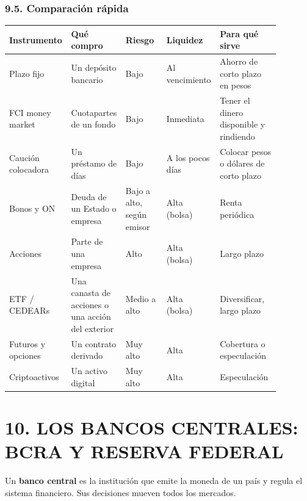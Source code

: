 \subsubsection*{9.5. Comparación rápida}
\begin{center}
\footnotesize
\setlength{\tabcolsep}{3pt}
\begin{tabular}{|>{\raggedright\arraybackslash}p{0.17\linewidth}|>{\raggedright\arraybackslash}p{0.17\linewidth}|>{\raggedright\arraybackslash}p{0.15\linewidth}|>{\raggedright\arraybackslash}p{0.17\linewidth}|>{\raggedright\arraybackslash}p{0.22\linewidth}|}
\hline
\textbf{Instrumento} & \textbf{Qué compro} & \textbf{Riesgo} & \textbf{Liquidez} &
\textbf{Para qué sirve} \\ \hline
Plazo fijo & Un depósito bancario & Bajo & Al vencimiento & Ahorro de corto plazo en pesos \\
\hline
FCI money market & Cuotapartes de un fondo & Bajo & Inmediata & Tener el dinero disponible y
rindiendo \\ \hline
Caución colocadora & Un préstamo de días & Bajo & A los pocos días & Colocar pesos o dólares
de corto plazo \\ \hline
Bonos y ON & Deuda de un Estado o empresa & Bajo a alto, según emisor & Alta (bolsa) & Renta
periódica \\ \hline
Acciones & Parte de una empresa & Alto & Alta (bolsa) & Largo plazo \\ \hline
ETF / CEDEARs & Una canasta de acciones o una acción del exterior & Medio a alto & Alta (bolsa)
& Diversificar, largo plazo \\ \hline
Futuros y opciones & Un contrato derivado & Muy alto & Alta & Cobertura o especulación \\
\hline
Criptoactivos & Un activo digital & Muy alto & Alta & Especulación \\ \hline
\end{tabular}
\end{center}

\section*{10. LOS BANCOS CENTRALES: BCRA Y RESERVA FEDERAL}

Un \textbf{banco central} es la institución que emite la moneda de un país y regula el sistema
financiero. Sus decisiones mueven todos los mercados.

